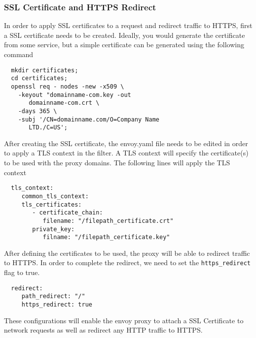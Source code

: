 \subsubsection{SSL Certificate and HTTPS Redirect}
In order to apply SSL certificates to a request and redirect traffic to HTTPS, first a SSL certificate needs to be created.
Ideally, you would generate the certificate from some service, but a simple certificate can be generated using the following command
\begin{verbatim}
  mkdir certificates;
  cd certificates;
  openssl req - nodes -new -x509 \
    -keyout "domainname-com.key -out 
       domainname-com.crt \
    -days 365 \
    -subj '/CN=domainname.com/O=Company Name 
       LTD./C=US';
\end{verbatim}
After creating the SSL certificate, the envoy.yaml file needs to be edited in order to apply a TLS context in the filter.
A TLS context will specify the certificate(s) to be used with the proxy domains. The following lines will apply the TLS context
\begin{verbatim}
  tls_context:
     common_tls_context:
     tls_certificates:
        - certificate_chain:
           filename: "/filepath_certificate.crt"
        private_key:
           filname: "/filepath_certificate.key"
\end{verbatim}
After defining the certificates to be used, the proxy will be able to redirect traffic to HTTPS. In order to complete the
redirect, we need to set the \verb|https_redirect| flag to true.
\begin{verbatim}
  redirect:
     path_redirect: "/"
     https_redirect: true    
\end{verbatim}
These configurations will enable the envoy proxy to attach a SSL Certificate to network requests as well as redirect any
HTTP traffic to HTTPS.

